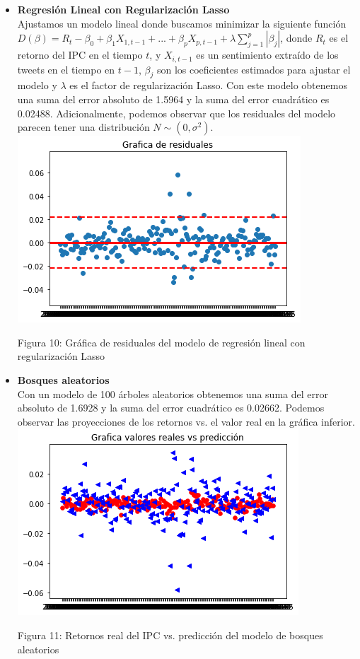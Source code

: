 \documentclass[12pt,reqno,letter]{article}
\newenvironment{fig2}[1][\unskip]{}{} %
\begin{document}
\begin{multicols}{2}
\begin{itemize}
  \item \textbf{Regresión Lineal con Regularización Lasso} \\
  Ajustamos un modelo lineal donde buscamos minimizar la siguiente función $D(\beta)=R_t-\beta_0+\beta_1 X_{1,t-1}+...+\beta_p X_{p,t-1}+\lambda \sum_{j=1}^p |\beta_j |$, donde $R_t$ es el retorno del IPC en el tiempo $t$, y $X_{i,t-1}$ es un sentimiento extraído de los tweets en el tiempo en $t-1$, $\beta_j$  son los coeficientes estimados para ajustar el modelo y $\lambda$ es el factor de regularización Lasso. Con este modelo obtenemos una suma del error absoluto de 1.5964 y la suma del error cuadrático es 0.02488. Adicionalmente, podemos observar que los residuales del modelo parecen tener una distribución $N \sim (0,\sigma ^2).$
    \\
 \begin{fig2}\includegraphics[scale=0.5]{img/Residuales_lasso.png}
 \caption{Figura 10: Gráfica de residuales del modelo de regresión lineal con regularización Lasso}\end{fig2}

  \item \textbf{Bosques aleatorios} \\
  Con un modelo de 100 árboles aleatorios obtenemos una suma del error absoluto de 1.6928 y la suma del error cuadrático es 0.02662. Podemos observar las proyecciones de los retornos vs. el valor real en la gráfica inferior.
      \\
 \begin{fig2}\includegraphics[scale=0.5]{img/Proy_RF.png}
 \caption{Figura 11: Retornos real del IPC vs. predicción del modelo de bosques aleatorios}\end{fig2}
  

\end{itemize}
\end{multicols}
\end{document}
